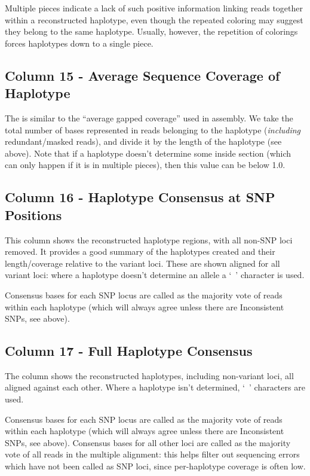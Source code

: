 \documentclass[11pt]{llncs}
\begin{document}
Multiple pieces indicate a lack of such positive information linking reads together within a reconstructed haplotype, even though the
repeated coloring may suggest they belong to the same haplotype.  Usually, however, the repetition
of colorings forces haplotypes down to a single piece.

\subsection{Column 15 - Average Sequence Coverage of Haplotype}

The is similar to the ``average gapped coverage'' used in assembly. We take the total number of bases represented in reads belonging to the haplotype
(\emph{including} redundant/masked reads), and divide it by the length of the haplotype (see above). Note that if a haplotype doesn't determine some
inside section (which can only happen if it is in multiple pieces), then this value can be below 1.0.

\subsection{Column 16 - Haplotype Consensus at SNP Positions}

This column shows the reconstructed haplotype regions, with all non-SNP loci removed. It provides a good summary of the haplotypes created and their
length/coverage relative to the variant loci. These are shown aligned for all variant loci: where a haplotype doesn't determine an allele
a `~' character is used.

Consensus bases for each SNP locus are called as the majority vote of reads within each haplotype (which will always agree unless there are Inconsistent
SNPs, see above).

\subsection{Column 17 - Full Haplotype Consensus}

The column shows the reconstructed haplotypes, including non-variant loci, all aligned against each other. Where a haplotype isn't determined,
`~' characters are used.  

Consensus bases for each SNP locus are called as the majority vote of reads within each haplotype (which will always agree unless there are Inconsistent
SNPs, see above). Consensus bases for all other loci are called as the majority vote of all reads in the multiple alignment: this helps filter out
sequencing errors which have not been called as SNP loci, since per-haplotype coverage is often low.
\end{document}
